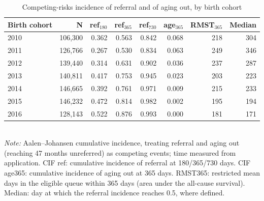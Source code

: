 \begin{table}[htbp]\centering
\caption{Competing-risks incidence of referral and of aging out, by birth cohort}
\label{tab:E1cohort}
\footnotesize
\setlength{\tabcolsep}{4pt}
\begin{tabular}{lrrrrrrr}
\toprule
Birth cohort & N & ref$_{180}$ & ref$_{365}$ & ref$_{730}$ & age$_{365}$ & RMST$_{365}$ & Median \\
\midrule
2010 & 106,300 & 0.362 & 0.563 & 0.842 & 0.068 & 218 & 304 \\
2011 & 126,766 & 0.267 & 0.530 & 0.834 & 0.063 & 249 & 346 \\
2012 & 139,440 & 0.314 & 0.631 & 0.902 & 0.036 & 237 & 287 \\
2013 & 140,811 & 0.417 & 0.753 & 0.945 & 0.023 & 203 & 223 \\
2014 & 146,665 & 0.392 & 0.761 & 0.971 & 0.009 & 215 & 233 \\
2015 & 146,232 & 0.472 & 0.814 & 0.982 & 0.002 & 195 & 194 \\
2016 & 128,143 & 0.522 & 0.876 & 0.993 & 0.000 & 181 & 171 \\
\bottomrule
\end{tabular}
\\[3pt]{\footnotesize \textit{Note:} Aalen--Johansen cumulative incidence, treating referral and aging out (reaching 47 months unreferred) as competing events; time measured from application. CIF ref: cumulative incidence of referral at 180/365/730 days. CIF age365: cumulative incidence of aging out at 365 days. RMST365: restricted mean days in the eligible queue within 365 days (area under the all-cause survival). Median: day at which the referral incidence reaches 0.5, where defined.}
\end{table}
